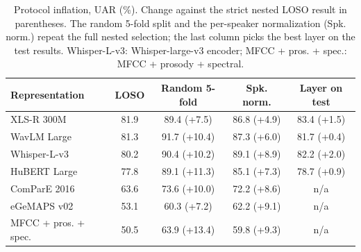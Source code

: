 \begin{table}[!t]
\centering
\caption{Protocol inflation, UAR (\%). Change against the strict nested LOSO result in parentheses. The random 5-fold split and the per-speaker normalization (Spk. norm.) repeat the full nested selection; the last column picks the best layer on the test results. Whisper-L-v3: Whisper-large-v3 encoder; MFCC + pros. + spec.: MFCC + prosody + spectral.}
\label{tab:inflation}
\setlength{\tabcolsep}{2pt}
\begin{tabular}{lcccc}
\toprule
Representation & LOSO & Random 5-fold & Spk. norm. & Layer on test \\
\midrule
XLS-R 300M & 81.9 & 89.4 (+7.5) & 86.8 (+4.9) & 83.4 (+1.5) \\
WavLM Large & 81.3 & 91.7 (+10.4) & 87.3 (+6.0) & 81.7 (+0.4) \\
Whisper-L-v3 & 80.2 & 90.4 (+10.2) & 89.1 (+8.9) & 82.2 (+2.0) \\
HuBERT Large & 77.8 & 89.1 (+11.3) & 85.1 (+7.3) & 78.7 (+0.9) \\
ComParE 2016 & 63.6 & 73.6 (+10.0) & 72.2 (+8.6) & n/a \\
eGeMAPS v02 & 53.1 & 60.3 (+7.2) & 62.2 (+9.1) & n/a \\
MFCC + pros. + spec. & 50.5 & 63.9 (+13.4) & 59.8 (+9.3) & n/a \\
\bottomrule
\end{tabular}
\end{table}
